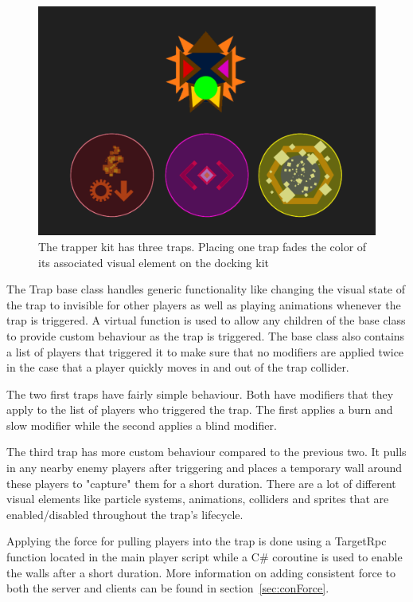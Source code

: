 \begin{figure}[tbph]  %
  \centering
  \includegraphics[width=.75\textwidth]{images/TrapperKitWithTraps}
  \caption[The trapper kit with its three traps]{The trapper kit has three traps. Placing one trap fades the color of its associated visual element on the docking kit}
  \label{fig:trapperKit}
\end{figure}

The Trap base class handles generic functionality like changing the visual state of the trap to invisible for other players as well as playing animations whenever the trap is triggered. A virtual function is used to allow any children of the base class to provide custom behaviour as the trap is triggered. The base class also contains a list of players that triggered it to make sure that no modifiers are applied twice in the case that a player quickly moves in and out of the trap collider. 

The two first traps have fairly simple behaviour. Both have modifiers that they apply to the list of players who triggered the trap. The first applies a burn and slow modifier while the second applies a blind modifier. 

The third trap has more custom behaviour compared to the previous two. It pulls in any nearby enemy players after triggering and places a temporary wall around these players to "capture" them for a short duration. There are a lot of different visual elements like particle systems, animations, colliders and sprites that are enabled/disabled throughout the trap's lifecycle. 

Applying the force for pulling players into the trap is done using a TargetRpc function located in the main player script while a C\# coroutine is used to enable the walls after a short duration. More information on adding consistent force to both the server and clients can be found in section~\ref{sec:conForce}. 

